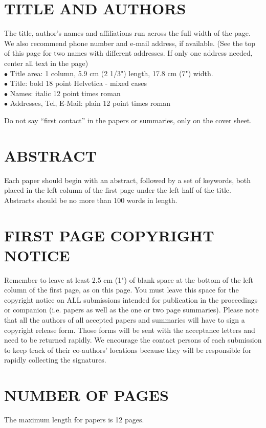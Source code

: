 \section{TITLE AND AUTHORS}
The title, author's names and affiliations run across the full width of
the page.  We also recommend phone number and e-mail address, if
available.  (See the top of this page for two names with different addresses.
If only one address needed, center all text in the page) \\
$\bullet$ Title area: 1 column, 5.9 cm (2 1/3") length, 17.8 cm (7") width. \\
$\bullet$ Title: bold 18 point Helvetica - mixed cases \\
$\bullet$ Names: italic 12 point times roman \\
$\bullet$ Addresses, Tel, E-Mail:  plain 12 point times roman

Do not say ``first contact'' in the papers or summaries, only on the
cover sheet.

\section{ABSTRACT}
Each paper should begin with an abstract, followed by a set of
keywords, both placed in the left column of the first page under the
left half of the title.  
Abstracts should be no more than 100 words in length.

\section{FIRST PAGE COPYRIGHT NOTICE}
Remember to leave at least 2.5 cm (1") of blank space at the bottom
of  the  left column  of  the first  page, as on this page. You must
leave this space for the copyright notice on ALL submissions
intended for publication in the proceedings or companion (i.e. papers
as well as the one or two page summaries).  Please note that all the
authors of all accepted papers and summaries will have to sign a
copyright release form.  Those forms will be sent with the acceptance
letters and need to be returned rapidly.  We encourage the contact
persons of each submission to keep track of their co-authors'
locations because they will be responsible for rapidly collecting the
signatures.

\section{NUMBER OF PAGES}
The maximum length for papers is 12 pages.

